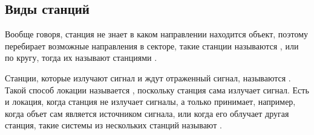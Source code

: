 \subsection{Виды станций}

Вообще говоря, станция не знает в каком направлении находится объект, поэтому перебирает возможные направления в секторе,
такие станции называются , или по кругу, тогда их называют станциями .

Станции, которые излучают сигнал и ждут отраженный сигнал, называются . Такой способ локации называется ,
поскольку станция сама излучает сигнал. Есть и  локация, когда станция не излучает сигналы, а только принимает, например,
когда объет сам является источником сигнала, или когда его облучает другая станция, такие системы из нескольких станций называют
.

